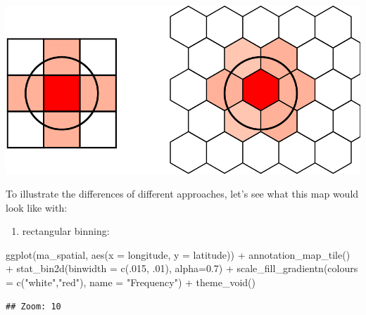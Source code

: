 \documentclass[
]{book}
\newenvironment{Shaded}{\begin{snugshade}}{\end{snugshade}}
\newcommand{\AttributeTok}[1]{\textcolor[rgb]{0.77,0.63,0.00}{#1}}
\newcommand{\DecValTok}[1]{\textcolor[rgb]{0.00,0.00,0.81}{#1}}
\newcommand{\FloatTok}[1]{\textcolor[rgb]{0.00,0.00,0.81}{#1}}
\newcommand{\FunctionTok}[1]{\textcolor[rgb]{0.00,0.00,0.00}{#1}}
\newcommand{\NormalTok}[1]{#1}
\newcommand{\SpecialCharTok}[1]{\textcolor[rgb]{0.00,0.00,0.00}{#1}}
\newcommand{\StringTok}[1]{\textcolor[rgb]{0.31,0.60,0.02}{#1}}
\providecommand{\tightlist}{%
  \setlength{\itemsep}{0pt}\setlength{\parskip}{0pt}}
\begin{document}
\includegraphics{crime_mapping_files/figure-latex/unnamed-chunk-127-1.pdf}

To illustrate the differences of different approaches, let's see what this map would look like with:

\begin{enumerate}
\def\labelenumi{\alph{enumi})}
\tightlist
\item
  rectangular binning:
\end{enumerate}

\begin{Shaded}
\begin{Highlighting}[]
\FunctionTok{ggplot}\NormalTok{(ma\_spatial, }\FunctionTok{aes}\NormalTok{(}\AttributeTok{x =}\NormalTok{ longitude, }\AttributeTok{y =}\NormalTok{ latitude)) }\SpecialCharTok{+} 
  \FunctionTok{annotation\_map\_tile}\NormalTok{() }\SpecialCharTok{+} 
  \FunctionTok{stat\_bin2d}\NormalTok{(}\AttributeTok{binwidth =} \FunctionTok{c}\NormalTok{(.}\DecValTok{015}\NormalTok{, .}\DecValTok{01}\NormalTok{), }\AttributeTok{alpha=}\FloatTok{0.7}\NormalTok{) }\SpecialCharTok{+} 
  \FunctionTok{scale\_fill\_gradientn}\NormalTok{(}\AttributeTok{colours =} \FunctionTok{c}\NormalTok{(}\StringTok{"white"}\NormalTok{,}\StringTok{"red"}\NormalTok{), }
                       \AttributeTok{name =} \StringTok{"Frequency"}\NormalTok{) }\SpecialCharTok{+} 
  \FunctionTok{theme\_void}\NormalTok{()}
\end{Highlighting}
\end{Shaded}

\begin{verbatim}
## Zoom: 10
\end{verbatim}
\end{document}

